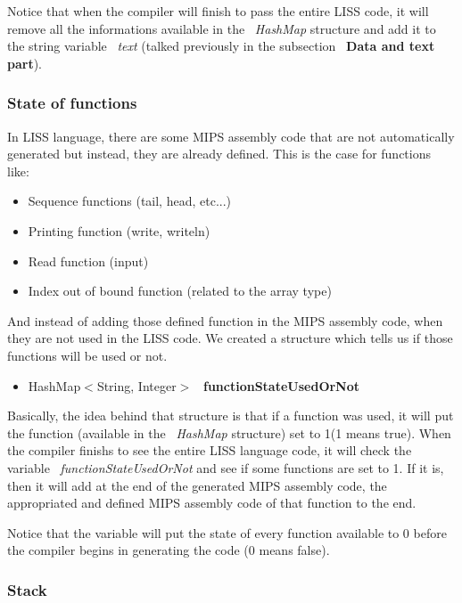 \documentclass[
  oneside,
  11pt, a4paper,
  footinclude=true,
  headinclude=true,
  cleardoublepage=empty
]{scrbook}
\begin{document}
Notice that when the compiler will finish to pass the entire LISS code, it will remove all the informations available in the ~\textit{HashMap} structure and add it to the string variable ~\textit{text} (talked previously in the subsection ~\textbf{Data and text part}).

\subsubsection{State of functions}

In LISS language, there are some MIPS assembly code that are not automatically generated but instead, they are already defined.
This is the case for functions like:

\begin{itemize}
\item Sequence functions (tail, head, etc...)
\item Printing function (write, writeln)
\item Read function (input)
\item Index out of bound function (related to the array type)
\end{itemize}

And instead of adding those defined function in the MIPS assembly code, when they are not used in the LISS code.
We created a structure which tells us if those functions will be used or not.

\begin{itemize}
\item  HashMap$<$String, Integer$>$ ~\textbf{functionStateUsedOrNot}
\end{itemize}

Basically, the idea behind that structure is that if a function was used, it will put the function (available in the ~\textit{HashMap} structure) set to 1(1 means true).
When the compiler finishs to see the entire LISS language code, it will check the variable ~\textit{functionStateUsedOrNot} and see if some functions are set to 1. If it is, then it will add at the end of the generated MIPS assembly code, the appropriated and defined MIPS assembly code of that function to the end.

Notice that the variable will put the state of every function available to 0 before the compiler begins in generating the code (0 means false).

\subsubsection{Stack}
\end{document}
